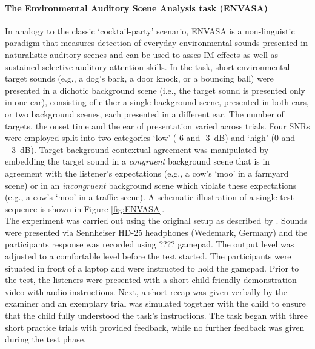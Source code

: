 \documentclass[a4paper, twoside]{templates/ociamthesis}
\begin{document}
\hypertarget{the-environmental-auditory-scene-analysis-task-envasa}{%
\paragraph{The Environmental Auditory Scene Analysis task (ENVASA)}\label{the-environmental-auditory-scene-analysis-task-envasa}}

\hfill\break
In analogy to the classic `cocktail-party' scenario, ENVASA is a non-linguistic paradigm \autocite{Leech2009} that measures detection of everyday environmental sounds presented in naturalistic auditory scenes and can be used to asses IM effects as well as sustained selective auditory attention skills. In the task, short environmental target sounds (e.g., a dog's bark, a door knock, or a bouncing ball) were presented in a dichotic background scene (i.e., the target sound is presented only in one ear), consisting of either a single background scene, presented in both ears, or two background scenes, each presented in a different ear. The number of targets, the onset time and the ear of presentation varied across trials. Four SNRs were employed split into two categories `low' (-6 and -3~dB) and `high' (0 and +3~dB). Target-background contextual agreement was manipulated by embedding the target sound in a \emph{congruent} background scene that is in agreement with the listener's expectations (e.g., a cow's `moo' in a farmyard scene) or in an \emph{incongruent} background scene which violate these expectations (e.g., a cow's `moo' in a traffic scene). A schematic illustration of a single test sequence is shown in Figure \ref{fig:ENVASA}.\\

The experiment was carried out using the original setup as described by \textcite{Leech2009}. Sounds were presented via Sennheiser HD-25 headphones (Wedemark, Germany) and the participants response was recorded using ???? gamepad. The output level was adjusted to a comfortable level before the test started. The participants were situated in front of a laptop and were instructed to hold the gamepad. Prior to the test, the listeners were presented with a short child-friendly demonstration video with audio instructions. Next, a short recap was given verbally by the examiner and an exemplary trial was simulated together with the child to ensure that the child fully understood the task's instructions. The task began with three short practice trials with provided feedback, while no further feedback was given during the test phase.\\
\end{document}
